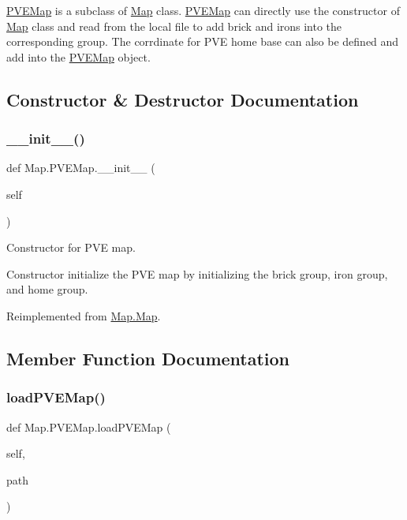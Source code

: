 \mbox{\hyperlink{class_map_1_1_p_v_e_map}{P\+V\+E\+Map}} is a subclass of \mbox{\hyperlink{class_map_1_1_map}{Map}} class. \mbox{\hyperlink{class_map_1_1_p_v_e_map}{P\+V\+E\+Map}} can directly use the constructor of \mbox{\hyperlink{class_map_1_1_map}{Map}} class and read from the local file to add brick and irons into the corresponding group. The corrdinate for P\+VE home base can also be defined and add into the \mbox{\hyperlink{class_map_1_1_p_v_e_map}{P\+V\+E\+Map}} object. 

\subsection{Constructor \& Destructor Documentation}
\mbox{\label{class_map_1_1_p_v_e_map_ae4a033a205c18ef5ba14c47aceb75306}} 
\subsubsection{\texorpdfstring{\_\_init\_\_()}{\_\_init\_\_()}}
{\footnotesize\ttfamily def Map.\+P\+V\+E\+Map.\+\_\+\+\_\+init\+\_\+\+\_\+ (\begin{DoxyParamCaption}\item[{}]{self }\end{DoxyParamCaption})}



Constructor for P\+VE map. 

Constructor initialize the P\+VE map by initializing the brick group, iron group, and home group. 

Reimplemented from \mbox{\hyperlink{class_map_1_1_map_a16b297030b6f61b2601cd40d2e5b5e0d}{Map.\+Map}}.



\subsection{Member Function Documentation}
\mbox{\label{class_map_1_1_p_v_e_map_ab94acdb2d91994c70b33351da1dac753}} 
\subsubsection{\texorpdfstring{loadPVEMap()}{loadPVEMap()}}
{\footnotesize\ttfamily def Map.\+P\+V\+E\+Map.\+load\+P\+V\+E\+Map (\begin{DoxyParamCaption}\item[{}]{self,  }\item[{}]{path }\end{DoxyParamCaption})}



